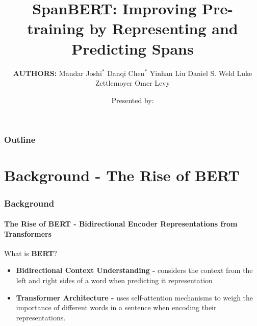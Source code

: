 \documentclass[12pt]{beamer}
\begin{document}
	
	\author[Jesse Annan]{ {\small Presented by:} }
	\title[SpanBERT]{SpanBERT: Improving Pre-training by Representing and Predicting Spans}
	\subtitle{
		{ \scriptsize \textbf{AUTHORS:} Mandar Joshi$^{*}$ \; Danqi Chen$^{*}$ \newline Yinhan Liu \; Daniel S. Weld \; Luke Zettlemoyer \; Omer Levy }
		}
    \date{}
	
	\begin{frame}[plain]
		\maketitle
	\end{frame}
	
	\begin{frame}
		\frametitle{Outline}
		
		\tableofcontents
		
	\end{frame}
	
	\section{Background - The Rise of BERT}
	\begin{frame}
		\frametitle{Background}
		\framesubtitle{The Rise of BERT - Bidirectional Encoder Representations from Transformers}
		
		{ \large What is \textbf{BERT}? \cite{googlebert} } \newline
		
		\begin{itemize}
			\item \textbf{Bidirectional Context Understanding - }considers the context from the left and right sides of a word when predicting it representation %
			
			\item \textbf{Transformer Architecture - }uses self-attention mechanisms to weigh the importance of different words in a sentence when encoding their representations.	
		\end{itemize}
		
	\end{frame}
	
\end{document}
